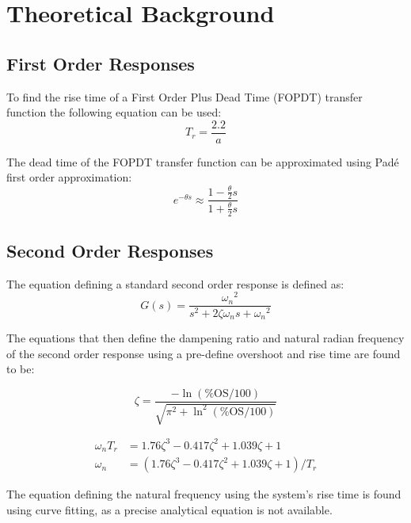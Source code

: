 \section{Theoretical Background}

\subsection{First Order Responses}
To find the rise time of a First Order Plus Dead Time (FOPDT) transfer function the following equation can be used:~\cite{control_systems}
\begin{equation}
    T_r = \frac{2.2}{a} \label{eq:first_order_Tr}
\end{equation}

The dead time of the FOPDT transfer function can be approximated using Pad\'e first order approximation:
\begin{equation}
    e^{-\theta s} \approx \frac{1 - \frac{\theta}{2}s}{1 + \frac{\theta}{2}s} \label{eq:Pade_approx}
\end{equation}

\subsection{Second Order Responses}
The equation defining a standard second order response is defined as:
\begin{equation*}
    G(s) = \frac{{\omega_n}^2}{s^2 + 2\zeta{\omega_n}s + {\omega_n}^2}
\end{equation*}

The equations that then define the dampening ratio and natural radian frequency of the second order response using a pre-define overshoot and rise time are found to be:~\cite{control_systems}

\begin{equation}
    \zeta = \frac{-\ln(\mathrm{\%OS}/100)}{\sqrt{\pi^2 + \ln^2(\mathrm{\%OS/100})}}\label{eq:zeta_from_OS}
\end{equation}

\begin{align}
    \omega_n T_r &= 1.76\zeta^3 - 0.417\zeta^2 + 1.039\zeta + 1 \nonumber \\
    \omega_n &= (1.76\zeta^3 - 0.417\zeta^2 + 1.039\zeta + 1)/T_r\label{eq:omega_n_from_zeta_and_Tr}
\end{align}

The equation defining the natural frequency using the system's rise time is found using curve fitting, as a precise analytical equation is not available.~\cite{control_systems}

